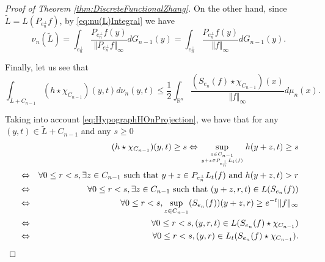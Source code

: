\documentclass{amsart}
\newcommand{\R}{\mathbb R}
\theoremstyle{remark}
\theoremstyle{definition}
\numberwithin{equation}{section}
\begin{document}
\begin{proof}[Proof of Theorem \ref{thm:DiscreteFunctionalZhang}]
On the other hand, since $\tilde{L}=L(P_{e_n^\perp}f)$, by \eqref{eq:nu(L)Integral} we have
$$
\nu_n(\tilde{L})=\int_{e_n^\perp}\frac{P_{e_n^\perp}f (y)}{\Vert P_{e_n^\perp}f\Vert_\infty}dG_{n-1}(y)=\int_{e_n^\perp}\frac{P_{e_n^\perp}f (y)}{\Vert f\Vert_\infty}dG_{n-1}(y).
$$

Finally, let us see that
\begin{equation}\label{eq:FromhToSymmetrization}
\int_{\tilde{L}+C_{n-1}} (h\star\chi_{C_{n-1}})(y,t)d\nu_n(y,t)\leq\frac{1}{2}\int_{\R^n}\frac{(S_{e_n}(f)\star\chi_{C_{n-1}})(x)}{\Vert f\Vert_\infty}d\mu_n(x).
\end{equation}

Taking into account \eqref{eq:HypographHOnProjection}, we have that for any $(y,t)\in \tilde{L}+C_{n-1}$ and any $s\geq0$
\begin{eqnarray*}
&&(h\star\chi_{C_{n-1}})(y,t)\geq s\Leftrightarrow\sup_{z\in C_{n-1}\atop y+z\in P_{e_n^\perp}L_t(f)}h(y+z,t)\geq s\cr
&\Leftrightarrow&\forall 0\leq r<s,\exists z\in C_{n-1}\textrm{ such that }y+z\in P_{e_n^\perp}L_t(f) \textrm{ and }h(y+z,t)> r\cr
&\Leftrightarrow&\forall 0\leq r<s,\exists z\in C_{n-1}\textrm{ such that }(y+z,r,t)\in L(S_{e_n}(f))\cr
&\Leftrightarrow& \forall 0\leq r<s, \sup_{z\in C_{n-1}} (S_{e_n}(f))(y+z,r)\geq e^{-t}\Vert f\Vert_\infty\cr
&\Leftrightarrow& \forall 0\leq r<s, (y,r,t)\in L(S_{e_n}(f)\star\chi_{C_{n-1}}) \cr
&\Leftrightarrow& \forall 0\leq r<s, (y,r)\in L_t(S_{e_n}(f)\star\chi_{C_{n-1}}).
\end{eqnarray*}


\end{proof}
\end{document}
